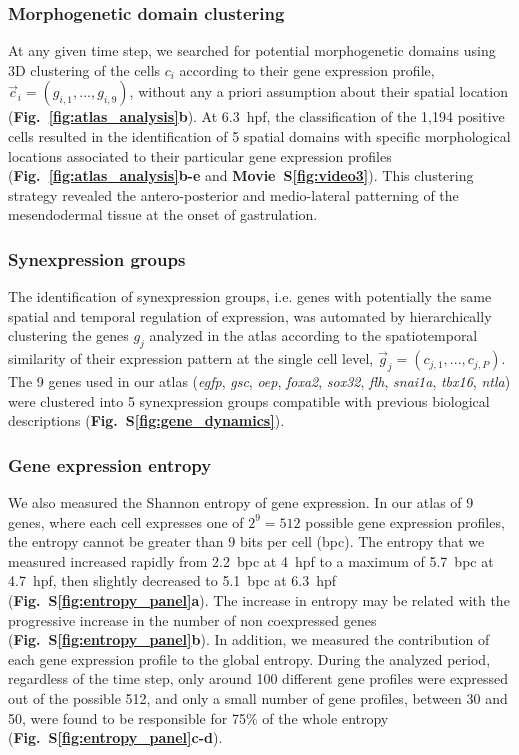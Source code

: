 \subsubsection*{Morphogenetic domain clustering}

At any given time step, we searched for potential morphogenetic domains using 3D clustering of the cells $c_i$ according to their gene expression profile, $\vec{c}_i = (g_{i,1}, ..., g_{i,9})$, without any a priori assumption about their spatial location (\textbf{Fig.~\ref{fig:atlas_analysis}b}). At 6.3~hpf, the classification of the 1,194 positive cells resulted in the identification of 5 spatial domains with specific morphological locations associated to their particular gene expression profiles (\textbf{Fig.~\ref{fig:atlas_analysis}b-e} and \textbf{Movie~S\ref{fig:video3}}). This clustering strategy revealed the antero-posterior and medio-lateral patterning of the mesendodermal tissue at the onset of gastrulation.

\subsubsection*{Synexpression groups}

The identification of synexpression groups, i.e. genes with potentially the same spatial and temporal regulation of expression, was automated by hierarchically clustering the genes $g_j$ analyzed in the atlas according to the spatiotemporal similarity of their expression pattern at the single cell level, $\vec{g}_j = (c_{j,1}, ..., c_{j,P})$. The 9 genes used in our atlas (\emph{egfp}, \emph{gsc}, \emph{oep}, \emph{foxa2}, \emph{sox32}, \emph{flh}, \emph{snai1a}, \emph{tbx16}, \emph{ntla}) were clustered into 5 synexpression groups compatible with previous biological descriptions\cite{kudoh2001gene} (\textbf{Fig.~S\ref{fig:gene_dynamics}}).

\subsubsection*{Gene expression entropy}

We also measured the Shannon entropy of gene expression. In our atlas of 9 genes, where each cell expresses one of $2^9=512$ possible gene expression profiles, the entropy cannot be greater than 9 bits per cell (bpc). The entropy that we measured increased rapidly from 2.2~bpc at 4~hpf to a maximum of 5.7~bpc at 4.7~hpf, then slightly decreased to 5.1~bpc at 6.3~hpf (\textbf{Fig.~S\ref{fig:entropy_panel}a}). The increase in entropy may be related with the progressive increase in the number of non coexpressed genes (\textbf{Fig.~S\ref{fig:entropy_panel}b}). In addition, we measured the contribution of each gene expression profile to the global entropy. During the analyzed period, regardless of the time step, only around 100 different gene profiles were expressed out of the possible 512, and only a small number of gene profiles, between 30 and 50, were found to be responsible for 75\% of the whole entropy (\textbf{Fig.~S\ref{fig:entropy_panel}c-d}). \\

